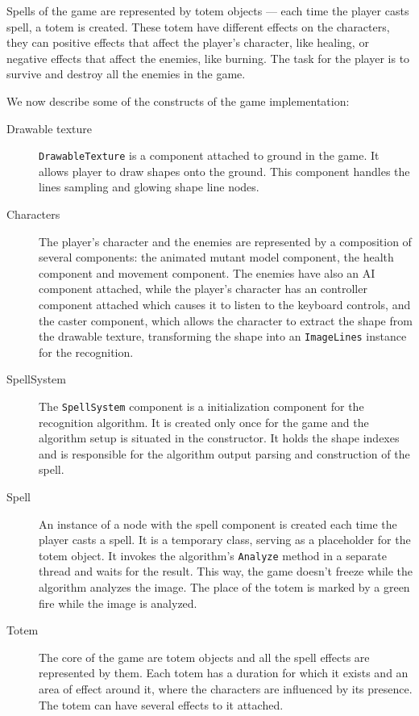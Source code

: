Spells of the game are represented by totem objects --- each time the player casts spell, a totem is created. These totem have different effects on the characters, they can  positive effects that affect the player's character, like healing, or negative effects that affect the enemies, like burning. The task for the player is to survive and destroy all the enemies in the game.

We now describe some of the constructs of the game implementation:

\begin{description}
\item [Drawable texture] \texttt{DrawableTexture} is a component attached to ground in the game. It allows player to draw shapes onto the ground. This component handles the lines sampling and glowing shape line nodes.

\item [Characters] The player's character and the enemies are represented by a composition of several components: the animated mutant model component, the health component and movement component. The enemies have also an AI component attached, while the player's character has an controller component attached which causes it to listen to the keyboard controls, and the caster component, which allows the character to extract the shape from the drawable texture, transforming the shape into an \texttt{ImageLines} instance for the recognition.

\item [SpellSystem] The \texttt{SpellSystem} component is a initialization component for the recognition algorithm. It is created only once for the game and the algorithm setup is situated in the constructor. It holds the shape indexes and is responsible for the algorithm output parsing and construction of the spell.

\item [Spell] An instance of a node with the spell component is created each time the player casts a spell. It is a temporary class, serving as a placeholder for the totem object. It invokes the algorithm's \texttt{Analyze} method in a separate thread and waits for the result. This way, the game doesn't freeze while the algorithm analyzes the image. The place of the totem is marked by a green fire while the image is analyzed. 

\item [Totem] The core of the game are totem objects and all the spell effects are represented by them. Each totem has a duration for which it exists and an area of effect around it, where the characters are influenced by its presence. The totem can have several effects to it attached.


\end{description}
